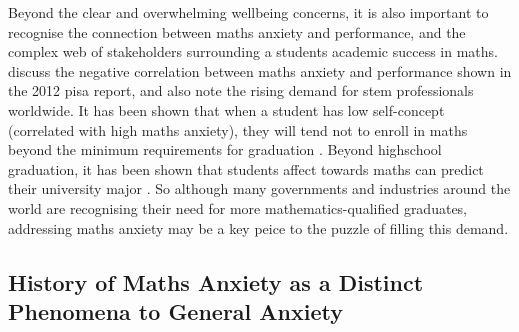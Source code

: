 \documentclass[14pt]{memoir}
\begin{document}
Beyond the clear and overwhelming wellbeing concerns, it is also important to recognise the connection between maths anxiety and performance, and the complex web of stakeholders surrounding a students academic success in maths.  discuss the negative correlation between maths anxiety and performance shown in the 2012 \gls{pisa} \cite{PISA2013} report, and also note the rising demand for \gls{stem} professionals worldwide. It has been shown that when a student has low self-concept (correlated with high maths anxiety), they will tend not to enroll in maths beyond the minimum requirements for graduation \cite{Ashcraft2007book}. Beyond highschool graduation, it has been shown that students affect towards maths can predict their university major \cite{LeFevre1992}. So although many governments and industries around the world are recognising their need for more mathematics-qualified graduates, addressing maths anxiety may be a key peice to the puzzle of filling this demand.

%

\subsection*{History of Maths Anxiety as a Distinct Phenomena to General Anxiety}
\end{document}
